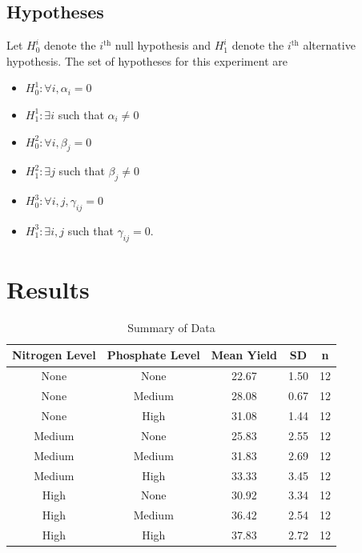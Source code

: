 \documentclass[12pt]{article}
\begin{document}
\subsection{Hypotheses}

Let $H^i_0$ denote the $i^\text{th}$ null hypothesis and $H^i_1$ denote the $i^\text{th}$ alternative hypothesis.
The set of hypotheses for this experiment are
\vspace{0.5em}
\begin{itemize}\setlength{\itemsep}{0.5em}
    \item $H^1_0: \forall i, \alpha_i = 0$
    \item $H^1_1: \exists i$ such that $\alpha_i \neq 0$
    \item $H^2_0: \forall i, \beta_j = 0$
    \item $H^2_1: \exists j$ such that $\beta_j \neq 0$
    \item $H^3_0: \forall i, j, \gamma_{ij} = 0$
    \item $H^3_1: \exists i,j$ such that $\gamma_{ij} = 0$.
\end{itemize}

\newpage

\section{Results}

\begin{table}[ht]
    \centering
    \caption{Summary of Data}
    \begin{tabular}{c|c|c|c|c}
         \textbf{Nitrogen Level} & \textbf{Phosphate Level} & \textbf{Mean Yield} & \textbf{SD} & \textbf{n}\\ \hline
         None & None & 22.67 & 1.50 & 12\\
         None & Medium & 28.08 & 0.67 & 12\\
         None & High & 31.08 & 1.44 & 12\\
         Medium & None & 25.83 & 2.55 & 12\\
         Medium & Medium & 31.83 & 2.69 & 12\\
         Medium & High & 33.33 & 3.45 & 12\\
         High & None & 30.92 & 3.34 & 12\\
         High & Medium & 36.42 & 2.54 & 12\\
         High & High & 37.83 & 2.72 & 12
    \end{tabular}
\end{table}
\end{document}
